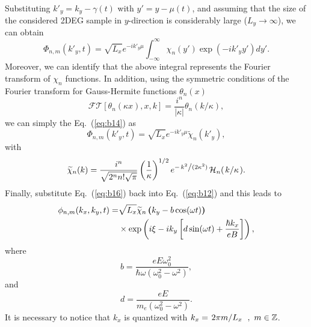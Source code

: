 \documentclass[
 reprint,
 amsmath,amssymb,
 aps,
 prb,
]{revtex4-2}
\begin{document}
\begin{appendix}
\begin{equation}
\begin{aligned}
  \end{aligned}
\end{equation}
Substituting ${k'_y} = k_y -\gamma(t)$ with $y' = y -\mu(t)$, and assuming that the size of the considered 2DEG sample in $y$-direction is considerably large ($L_y \rightarrow \infty$), we can obtain
\begin{equation} \label{eq:b14}
  \Phi_{n,m}({k'_y} ,t) =
  {\sqrt{L_x}} e^{-i {k'_y}\mu}
  \int_{-\infty}^{\infty} \chi_{n}(y') \exp(-i{k'_y} y') dy'.
\end{equation}
Moreover, we can identify that the above integral represents the Fourier transform of $\chi_n$ functions. In addition, using the symmetric conditions of the Fourier transform for Gauss-Hermite functions $\theta_n(x)$ \cite{celeghini21}
\begin{equation} \label{eq:b15}
  \mathcal{FT}[\theta_n(\kappa x),x,k] = \frac{i^n}{|\kappa|}\theta_n(k/\kappa),
\end{equation}
we can simply the Eq.~(\ref{eq:b14}) as
\begin{equation} \label{eq:b16}
  \Phi_{n,m}({k'_y} ,t) =
  \sqrt{L_x} e^{-i {k'_y}\mu} \widetilde{\chi}_n(k'_y),
\end{equation}
with
\begin{equation} \label{eq:b17}
  \widetilde{\chi}_{n}(k) =
  \frac{i^n}{\sqrt{2^{n} n! \sqrt{\pi}}}
  \left(\frac{1}{\kappa} \right)^{1/2}
  e^{-\flatfrac{k^2}{(2 \kappa^2)}}
  \mathcal{H}_n (\flatfrac{k}{\kappa}).
\end{equation}
Finally, substitute Eq.~(\ref{eq:b16}) back into Eq.~(\ref{eq:b12}) and this leads to
\begin{equation} \label{eq:b18}
  \begin{aligned}
    \phi_{n,m}(k_x,k_y,t)  = &
    {\sqrt{L_x}} \widetilde{\chi}_n \bm{\left(} k_y - b\cos(\omega t)\bm{\right)} \\
    & \times
    \exp \left(
      i\xi -ik_y  \left[d\sin(\omega t) + \frac{\hbar k_x}{eB} \right]
    \right),
  \end{aligned}
\end{equation}
where
\begin{equation} \label{eq:b19}
  b =
  \frac{eE\omega_0^2}{\hbar\omega(\omega_0^2 - \omega^2)},
\end{equation}
and
\begin{equation} \label{eq:b20}
  d =
 \frac{eE}{m_e(\omega_0^2 - \omega^2)}.
\end{equation}
It is necessary to notice that $k_x$ is quantized with $k_x = \flatfrac{2\pi m}{L_x} ~,~ m \in \mathbb{Z}$.


\end{appendix}
\end{document}
